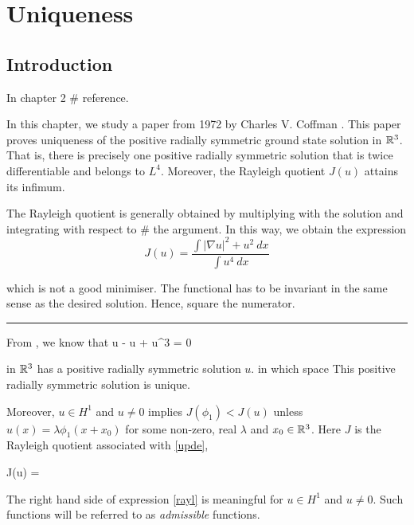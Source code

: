 \newcommand{\intrrr}{\int_{\R^3}}
\chapter{Uniqueness}
\section{Introduction}

In chapter 2 \# reference.

In this chapter, we study a paper from 1972 by Charles V. Coffman \cite{coffm}. 
{\green This paper proves uniqueness of the positive radially symmetric ground
state solution in $\mathbb{R}^3$.} {\red That is, there is precisely one positive radially
symmetric solution that is twice differentiable and belongs to $L^4$.  Moreover,
the Rayleigh quotient $J(u)$ attains its infimum.}

{\red The Rayleigh quotient is generally obtained by multiplying with the solution and
integrating with respect to \# the argument. In this way, we obtain the
expression $$J(u) = \dfrac{\int\left|\nabla u\right|^2+u^2~dx}{\int u^4~dx}$$

which is not a good minimiser. The functional has to be invariant in the same
sense as the desired solution. Hence, square the numerator.}


\hfill\hrule


From \cite{nehari}, we know that
\be\label{upde}
\Delta u - u + u^3 = 0
\ee

in $\mathbb{R}^3$ has a positive radially symmetric solution $u$. {\red in which space}
This positive radially symmetric solution is unique. 

Moreover, $u \in H^1$ and $u\neq 0$ implies $J(\phi_1) < J(u)$ unless
$u(x) = \lambda \phi_1 \left( x + x_0 \right)$ for some non-zero, real $\lambda$
and $x_0 \in \mathbb{R}^3$. Here $J$ is the Rayleigh quotient associated with
\eqref{upde},

\be\label{rayl}
J(u) = \frac{\left( \intrrr |\nabla u|^2 + u^2 \diff x \right)^2}{\int_{R^3} u^4 \diff x}
\ee

The right hand side of expression \eqref{rayl} is meaningful for $u\in H^1$ and
$u\neq 0$. Such functions will be referred to as \emph{admissible} functions.


